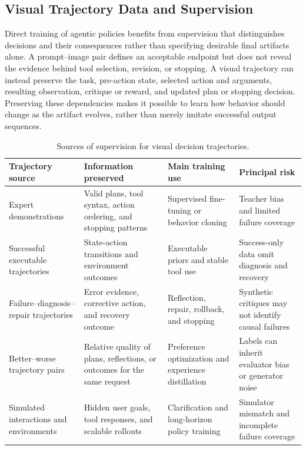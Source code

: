 \subsection{Visual Trajectory Data and Supervision}
\label{subsec:trajectory-supervision}

Direct training of agentic policies benefits from supervision that distinguishes decisions and their consequences rather than specifying desirable final artifacts alone. A prompt--image pair defines an acceptable endpoint but does not reveal the evidence behind tool selection, revision, or stopping. A visual trajectory can instead preserve the task, pre-action state, selected action and arguments, resulting observation, critique or reward, and updated plan or stopping decision. Preserving these dependencies makes it possible to learn how behavior should change as the artifact evolves, rather than merely imitate successful output sequences.

\begin{table}[t]
  \caption{Sources of supervision for visual decision trajectories.}
  \label{tab:trajectory-supervision}
  \small
  \begin{tabularx}{\textwidth}{@{}p{}XXX@{}}
    \toprule
    Trajectory source & Information preserved & Main training use & Principal risk \\
    \midrule
    Expert demonstrations & Valid plans, tool syntax, action ordering, and stopping patterns & Supervised fine-tuning or behavior cloning & Teacher bias and limited failure coverage \\
    Successful executable trajectories & State-action transitions and environment outcomes & Executable priors and stable tool use & Success-only data omit diagnosis and recovery \\
    Failure--diagnosis--repair trajectories & Error evidence, corrective action, and recovery outcome & Reflection, repair, rollback, and stopping & Synthetic critiques may not identify causal failures \\
    Better--worse trajectory pairs & Relative quality of plans, reflections, or outcomes for the same request & Preference optimization and experience distillation & Labels can inherit evaluator bias or generator noise \\
    Simulated interactions and environments & Hidden user goals, tool responses, and scalable rollouts & Clarification and long-horizon policy training & Simulator mismatch and incomplete failure coverage \\
    \bottomrule
  \end{tabularx}
\end{table}
\FloatBarrier

